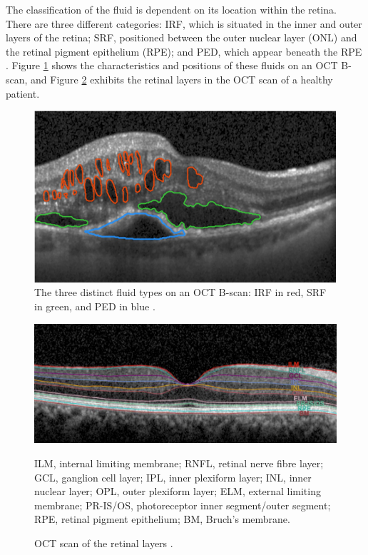 \par
The classification of the fluid is dependent on its location within the retina. There are three different categories: IRF, which is situated in the inner and outer layers of the retina; SRF, positioned between the outer nuclear layer (ONL) and the retinal pigment epithelium (RPE); and PED, which appear beneath the RPE \parencite{Bogunovic2019a}. Figure \ref{fig:SegmentedFluidsOCT} shows the characteristics and positions of these fluids on an OCT B-scan, and Figure \ref{fig:RetinalLayers} exhibits the retinal layers in the OCT scan of a healthy patient.
\par
\begin{figure}[!ht]
	\centering
	\includegraphics[width=0.75\linewidth]{figures/SegmentedFluidsOCT.png}
	\caption{The three distinct fluid types on an OCT B-scan: IRF in red, SRF in green, and PED in blue \parencite{Bogunovic2019a}.}
	\label{fig:SegmentedFluidsOCT}
\end{figure}
\begin{figure}[!ht]
	\centering
	\includegraphics[width=1\linewidth]{figures/RetinalLayers}
	\caption{OCT scan of the retinal layers \parencite{Almonte2020}.}
	\label{fig:RetinalLayers}
	\footnotesize
	\justifying
	ILM, internal limiting membrane; RNFL, retinal nerve fibre layer; GCL, ganglion cell layer; IPL, inner plexiform layer; INL, inner nuclear layer; OPL, outer plexiform layer; ELM, external limiting membrane; PR-IS/OS, photoreceptor inner segment/outer segment; RPE, retinal pigment epithelium; BM, Bruch's membrane. 
\end{figure}
